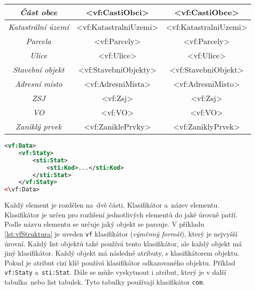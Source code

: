 \begin{table}[!h]
\begin{tabular}{|c|c|c|}
    \textit{Část obce}                   & \textless{}vf:CastiObci\textgreater{}          & \textless{}vf:CastiObce\textgreater{}         \\ \hline
    \textit{Katastrální území}           & \textless{}vf:KatastralniUzemi\textgreater{}   & \textless{}vf:KatastralniUzemi\textgreater{}  \\ \hline
    \textit{Parcela}                     & \textless{}vf:Parcely\textgreater{}            & \textless{}vf:Parcely\textgreater{}           \\ \hline
    \textit{Ulice}                       & \textless{}vf:Ulice\textgreater{}              & \textless{}vf:Ulice\textgreater{}             \\ \hline
    \textit{Stavební objekt}             & \textless{}vf:StavebniObjekty\textgreater{}    & \textless{}vf:StavebniObjekt\textgreater{}    \\ \hline
    \textit{Adresní místo}               & \textless{}vf:AdresniMista\textgreater{}       & \textless{}vf:AdresniMisto\textgreater{}      \\ \hline
    \textit{ZSJ}                         & \textless{}vf:Zsj\textgreater{}                & \textless{}vf:Zsj\textgreater{}               \\ \hline
    \textit{VO}                          & \textless{}vf:VO\textgreater{}                 & \textless{}vf:VO\textgreater{}                \\ \hline
    \textit{Zaniklý prvek}               & \textless{}vf:ZaniklePrvky\textgreater{}       & \textless{}vf:ZaniklyPrvek\textgreater{}      \\ \hline
    \end{tabular}
\end{table}

\newpage

\begin{lstlisting}[language=xml, caption={Příklad XML Struktury}, label=lst:vfStruktura]
<vf:Data>
    <vf:Staty>
        <sti:Stat>
            <sti:Kod>...</sti:Kod>
        </sti:Stat>
    </vf:Staty>
<\vf:Data>
\end{lstlisting}

Každý element je rozdělen na~dvě části.
Klasifikátor a~název elementu.
Klasifikátor je určen pro rozlišení jednotlivých elementů do jaké úrovně patří.
Podle názvu elementu se určuje jaký objekt se parsuje.
V příkladu \ref{lst:vfStruktura} je uveden \texttt{vf} klasifikátor (\textit{výměnný formát}), který je nejvyšší úrovní.
Každý list objektů také používá tento klasifikátor, ale každý objekt má jiný klasifikátor.
Každý objekt má následně atributy, s klasifikátorem objektu. Pokud je atribut cizí klíč používá klasifikátor odkazovaného objektu.
Příklad \texttt{vf:Staty} a~\texttt{sti:Stat}.
Dále se může vyskytnout i atribut, který je v další tabulka~nebo list tabulek. Tyto tabulky používají klasifikátor \texttt{com}.

